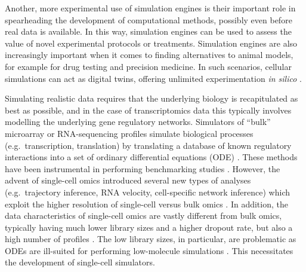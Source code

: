 \documentclass[10pt, a4paper]{article}
\begin{document}
Another, more experimental use of simulation engines is their important
role in spearheading the development of computational methods, possibly
even before real data is available. In this way, simulation engines can
be used to assess the value of novel experimental protocols or
treatments. Simulation engines are also increasingly important when it
comes to finding alternatives to animal models, for example for drug
testing and precision medicine. In such scenarios, cellular simulations
can act as digital twins, offering unlimited experimentation \emph{in
	silico} \cite{bjornsson_digitaltwinspersonalize_2019}.

Simulating realistic data requires that the underlying biology is
recapitulated as best as possible, and in the case of transcriptomics
data this typically involves modelling the underlying gene regulatory
networks. Simulators of ``bulk'' microarray or RNA-sequencing profiles
simulate biological processes (e.g.~transcription, translation) by
translating a database of known regulatory interactions into a set of
ordinary differential equations (ODE)
\cite{roy_systemgeneratingtranscription_2008,hache_gengesystematicgeneration_2009,schaffter_genenetweaversilicobenchmark_2011,vandenbulcke_syntrengeneratorsynthetic_2006}.
These methods have been instrumental in performing benchmarking studies
\cite{prill_rigorousassessmentsystems_2010,marbach_revealingstrengthsweaknesses_2010,marbach_wisdomcrowdsrobust_2012}.
However, the advent of single-cell omics introduced several new types of
analyses (e.g.~trajectory inference, RNA velocity, cell-specific network
inference) which exploit the higher resolution of single-cell versus
bulk omics \cite{luecken_currentbestpractices_2019}. In addition,
the data characteristics of single-cell omics are vastly different from
bulk omics, typically having much lower library sizes and a higher
dropout rate, but also a high number of profiles
\cite{vallejos_normalizingsinglecellrna_2017}. The low library
sizes, in particular, are problematic as ODEs are ill-suited for
performing low-molecule simulations
\cite{gillespie_exactstochasticsimulation_1977}. This necessitates
the development of single-cell simulators.
\end{document}
